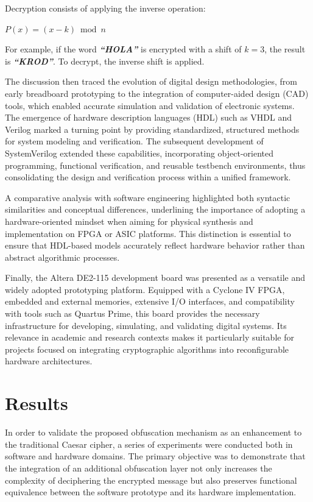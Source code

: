\documentclass[journal,article,submit,pdftex,moreauthors]{Definitions/mdpi}
\begin{document}
Decryption consists of applying the inverse operation:

\centerline{$P(x) = ( x - k ) \bmod n $}

For example, if the word \textbf{\textit{“HOLA”}} is encrypted with a shift of $k = 3$, the result is \textbf{\textit{“KROD”}}. To decrypt, the inverse shift is applied.


The discussion then traced the evolution of digital design methodologies, from early breadboard prototyping to the integration of computer-aided design (CAD) tools, which enabled accurate simulation and validation of electronic systems. The emergence of hardware description languages (HDL) such as VHDL and Verilog marked a turning point by providing standardized, structured methods for system modeling and verification. The subsequent development of SystemVerilog extended these capabilities, incorporating object-oriented programming, functional verification, and reusable testbench environments, thus consolidating the design and verification process within a unified framework.

A comparative analysis with software engineering highlighted both syntactic similarities and conceptual differences, underlining the importance of adopting a hardware-oriented mindset when aiming for physical synthesis and implementation on FPGA or ASIC platforms. This distinction is essential to ensure that HDL-based models accurately reflect hardware behavior rather than abstract algorithmic processes.

Finally, the Altera DE2-115 development board was presented as a versatile and widely adopted prototyping platform. Equipped with a Cyclone IV FPGA, embedded and external memories, extensive I/O interfaces, and compatibility with tools such as Quartus Prime, this board provides the necessary infrastructure for developing, simulating, and validating digital systems. Its relevance in academic and research contexts makes it particularly suitable for projects focused on integrating cryptographic algorithms into reconfigurable hardware architectures.





\section{Results}

In order to validate the proposed obfuscation mechanism as an enhancement to the traditional Caesar cipher, a series of experiments were conducted both in software and hardware domains. The primary objective was to demonstrate that the integration of an additional obfuscation layer not only increases the complexity of deciphering the encrypted message but also preserves functional equivalence between the software prototype and its hardware implementation.
\end{document}

